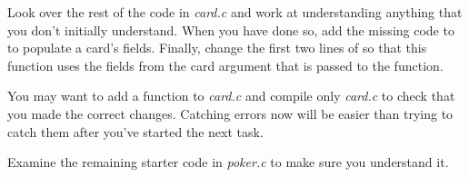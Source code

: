 Look over the rest of the code in \textit{card.c} and work at understanding anything that you don't initially understand.
When you have done so, add the missing code to  to populate a card's fields.
Finally, change the first two lines of  so that this function uses the fields from the card argument that is passed to the function.

You may want to add a  function to \textit{card.c} and compile only \textit{card.c} to check that you made the correct changes.
Catching errors now will be easier than trying to catch them after you've started the next task.

Examine the remaining starter code in \textit{poker.c} to make sure you understand it.
